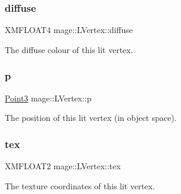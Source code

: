 \subsubsection{\texorpdfstring{diffuse}{diffuse}}
{\footnotesize\ttfamily X\+M\+F\+L\+O\+A\+T4 mage\+::\+L\+Vertex\+::diffuse}

The diffuse colour of this lit vertex. \hypertarget{structmage_1_1_l_vertex_aa757bf891210af126ff9fca970aa843d}{}\label{structmage_1_1_l_vertex_aa757bf891210af126ff9fca970aa843d} 
\subsubsection{\texorpdfstring{p}{p}}
{\footnotesize\ttfamily \hyperlink{structmage_1_1_point3}{Point3} mage\+::\+L\+Vertex\+::p}

The position of this lit vertex (in object space). \hypertarget{structmage_1_1_l_vertex_abeca49c231f9b85063dbd4c0522d7edc}{}\label{structmage_1_1_l_vertex_abeca49c231f9b85063dbd4c0522d7edc} 
\subsubsection{\texorpdfstring{tex}{tex}}
{\footnotesize\ttfamily X\+M\+F\+L\+O\+A\+T2 mage\+::\+L\+Vertex\+::tex}

The texture coordinates of this lit vertex. 